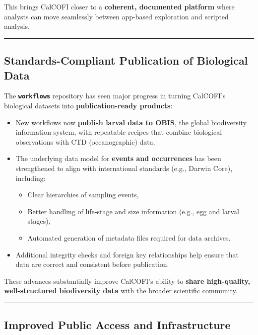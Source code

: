 \documentclass[
  letterpaper,
  DIV=11,
  numbers=noendperiod]{scrreprt}
\providecommand{\tightlist}{%
  \setlength{\itemsep}{0pt}\setlength{\parskip}{0pt}}
\begin{document}
This brings CalCOFI closer to a \textbf{coherent, documented platform}
where analysts can move seamlessly between app-based exploration and
scripted analysis.

\begin{center}\rule{0.5\linewidth}{0.5pt}\end{center}

\subsection{Standards-Compliant Publication of Biological
Data}\label{standards-compliant-publication-of-biological-data}

The \textbf{\texttt{workflows}} repository has seen major progress in
turning CalCOFI's biological datasets into \textbf{publication-ready
products}:

\begin{itemize}
\tightlist
\item
  New workflows now \textbf{publish larval data to OBIS}, the global
  biodiversity information system, with repeatable recipes that combine
  biological observations with CTD (oceanographic) data.
\item
  The underlying data model for \textbf{events and occurrences} has been
  strengthened to align with international standards (e.g., Darwin
  Core), including:

  \begin{itemize}
  \tightlist
  \item
    Clear hierarchies of sampling events,
  \item
    Better handling of life‑stage and size information (e.g., egg and
    larval stages),
  \item
    Automated generation of metadata files required for data archives.
  \end{itemize}
\item
  Additional integrity checks and foreign key relationships help ensure
  that data are correct and consistent before publication.
\end{itemize}

These advances substantially improve CalCOFI's ability to \textbf{share
high-quality, well-structured biodiversity data} with the broader
scientific community.

\begin{center}\rule{0.5\linewidth}{0.5pt}\end{center}

\subsection{Improved Public Access and
Infrastructure}\label{improved-public-access-and-infrastructure}
\end{document}
